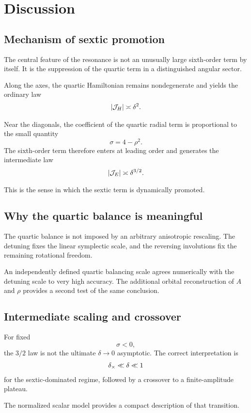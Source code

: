 \section{Discussion}
\label{sec:discussion}

\subsection{Mechanism of sextic promotion}

The central feature of the resonance is not an unusually large sixth-order term by itself. It is the suppression of the quartic term in a distinguished angular sector.

Along the axes, the quartic Hamiltonian remains nondegenerate and yields the ordinary law
\[
|\mathcal{J}_H|\asymp\delta^2.
\]

Near the diagonals, the coefficient of the quartic radial term is proportional to the small quantity
\[
\sigma=4-\rho^2.
\]
The sixth-order term therefore enters at leading order and generates the intermediate law
\[
|\mathcal{J}_E|\asymp\delta^{3/2}.
\]

This is the sense in which the sextic term is dynamically promoted.

\subsection{Why the quartic balance is meaningful}

The quartic balance is not imposed by an arbitrary anisotropic rescaling. The detuning fixes the linear symplectic scale, and the reversing involutions fix the remaining rotational freedom.

An independently defined quartic balancing scale agrees numerically with the detuning scale to very high accuracy. The additional orbital reconstruction of \(A\) and \(\rho\) provides a second test of the same conclusion.

\subsection{Intermediate scaling and crossover}

For fixed
\[
\sigma<0,
\]
the \(3/2\) law is not the ultimate \(\delta\to0\) asymptotic. The correct interpretation is
\[
\delta_\times\ll\delta\ll1
\]
for the sextic-dominated regime, followed by a crossover to a finite-amplitude plateau.

The normalized scalar model provides a compact description of that transition.

